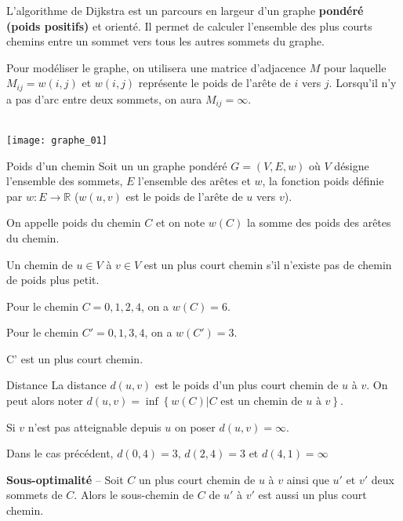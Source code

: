 L'algorithme de Dijkstra est un parcours en largeur d'un graphe \textbf{pondéré (poids positifs)} et orienté. Il permet de calculer l'ensemble des plus courts chemins entre un sommet vers tous les autres sommets du graphe.

Pour modéliser le graphe, on utilisera une matrice d'adjacence $M$ pour laquelle $M_{ij}=w(i,j)$ et $w(i,j)$ représente le poids de l'arête de $i$ vers $j$. Lorsqu'il n'y a pas d'arc entre deux sommets, on aura $M_{ij}=\infty$.

\begin{exemple}  ~\\
\texttt{[image: graphe\_01]}
\end{exemple}

\begin{defi}{Poids d'un chemin}
Soit un un graphe pondéré $G=\left(V, E, w\right)$ où $V$ désigne l'ensemble des sommets, $E$ l'ensemble des arêtes et 
$w$, la fonction poids définie par $w : E \rightarrow \mathbb{R}$ ($w(u, v)$ est le poids de l’arête de $u$ vers $v$).

On appelle poids du chemin $C$ et on note $w(C)$ la somme des poids des arêtes du chemin. 

Un chemin de $u\in V$ à $v\in V$ est un plus court chemin s'il n'existe pas de chemin de poids plus petit. 
\end{defi}


\begin{exemple}
Pour le chemin $C = 0, 1,2,4$, on a $w(C)=6$. 

Pour le chemin $C' = 0, 1,3,4$, on a $w(C')=3$. 

C' est un plus court chemin. 
\end{exemple}

\begin{defi} {Distance}
La distance $d\left(u,v\right)$ est le poids d'un plus court chemin de $u$ à $v$. On peut alors noter 
$d(u,v)=\inf\left\{
w(C) | C \text{ est un chemin de } u \text{ à } v
\right\}$.

Si $v$  n'est pas atteignable depuis $u$ on poser $d(u,v)=\infty$.

\end{defi}

\begin{exemple}
Dans le cas précédent, $d(0,4)=3$, 
$d(2,4)=3$ et $d(4,1)=\infty$


\end{exemple}

\begin{prop}
\textbf{Sous-optimalité} -- Soit $C$ un plus court chemin de $u$ à $v$ ainsi que $u'$ et $v'$ deux sommets de $C$. Alors le sous-chemin de $C$ de $u'$ à $v'$ est aussi un plus court chemin.
\end{prop}


